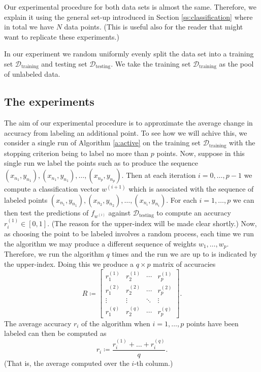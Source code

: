 \documentclass[11pt]{amsart}
\theoremstyle{definition}
\theoremstyle{remark}
\begin{document}
        Our experimental procedure for both data sets is almost the same. Therefore, we explain it using the general set-up introduced in Section \ref{ss:classification} where in total we have $N$ data points. (This is useful also for the reader that might want to replicate these experiments.) 

        In our experiment we random uniformly evenly split the data set into a training set $\mathcal{D}_\text{training}$ and testing set $\mathcal{D}_\text{testing}$. We take the training set $\mathcal{D}_\text{training}$ as the pool of unlabeled data.

    \subsection{The experiments} 
        The aim of our experimental procedure is to approximate the average change in accuracy from labeling an additional point. To see how we will achive this, we consider a single run of Algorithm \ref{a:active} on the training set $\mathcal{D}_\text{training}$ with the stopping criterion being to label no more than $p$ points. Now, suppose in this single run we label the points such as to produce the sequence $(x_{n_1}, y_{n_1}), (x_{n_1}, y_{n_1}), \dots, (x_{n_{p}}, y_{n_{p}})$. Then at each iteration $i = 0, \dots, p - 1$ we compute a classification vector $w^{(i + 1)}$ which is associated with the sequence of labeled points $(x_{n_1}, y_{n_1}), (x_{n_2}, y_{n_2}), \dots, (x_{n_{i}}, y_{n_{i}})$. For each $i = 1, \dots, p$ we can then test the predictions of $f_{w^{(i)}}$ against $\mathcal{D}_\text{testing}$ to compute an accuracy $r^{(1)}_i \in [0, 1]$. (The reason for the upper-index will be made clear shortly.) Now, as choosing the point to be labeled involves a random process, each time we run the algorithm we may produce a different sequence of weights $w_1, \dots, w_p$. Therefore, we run the algorithm $q$ times and the run we are up to is indicated by the upper-index. Doing this we produce a $q \times p$ matrix of accuracies
        \begin{equation*}
            R \coloneqq \begin{bmatrix}
            r_1^{(1)} &  r_2^{(1)}  & \cdots & r_p^{(1)}\\
            r_1^{(2)}  &  r_2^{(2)} & \cdots & r_p^{(2)}\\
            \vdots & \vdots & \ddots & \vdots\\
            r_1^{(q)}  &  r_2^{(q)}  & \cdots & r_p^{(q)}
            \end{bmatrix}.
        \end{equation*}
        The average accuracy $r_i$ of the algorithm when $i = 1, \dots, p$ points have been labeled can then be computed as
        \begin{equation*}
            r_i \coloneqq \frac{r_i^{(1)} + \dots + r_i^{(q)}}{q}.
        \end{equation*}
        (That is, the average computed over the $i$-th column.)
\end{document}
